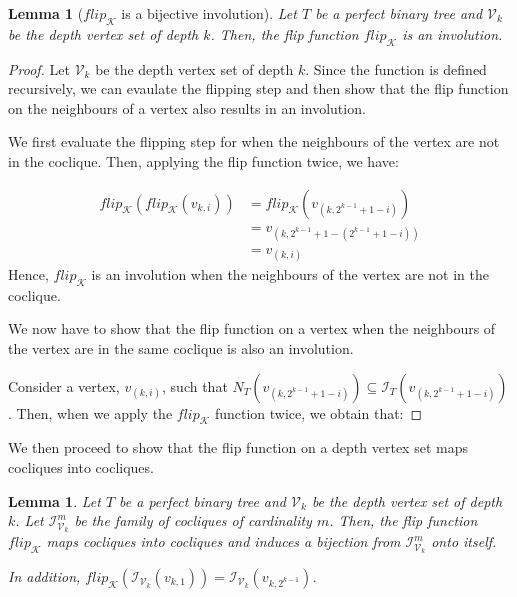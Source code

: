 \documentclass[11pt,a4paper]{article}
\newtheorem{lemma}[theorem]{Lemma}
\theoremstyle{definition}
\begin{document}
\begin{lemma}[$flip_\mathcal{K}$ is a bijective involution]\label{lemma_flip_bijective_involution}
	Let $T$ be a perfect binary tree and $\mathcal{V}_k$ be the depth vertex set of depth $k$. Then, the flip function $flip_\mathcal{K}$ is an involution.
\end{lemma}
\begin{proof}
	Let $\mathcal{V}_k$ be the depth vertex set of depth $k$. Since the function is defined recursively, we can evaulate the flipping step and then show that the flip function on the neighbours of a vertex also results in an involution.

	We first evaluate the flipping step for when the neighbours of the vertex are not in the coclique. Then, applying the flip function twice, we have:

	\begin{align*}
		flip_\mathcal{K}(flip_\mathcal{K}(v_{k, i})) & = flip_\mathcal{K}(v_{(k, 2^{k-1} + 1 - i)}) \\
		                                             & = v_{(k, 2^{k-1} + 1 - (2^{k-1} + 1 - i))}   \\
		                                             & = v_{(k, i)}
	\end{align*}
	Hence, $flip_\mathcal{K}$ is an involution when the neighbours of the vertex are not in the coclique.

	We now have to show that the flip function on a vertex when the neighbours of the vertex are in the same coclique is also an involution.

	Consider a vertex, $v_{(k, i)}$, such that $N_T(v_{(k, 2^{k-1} + 1 - i)}) \subseteq \mathcal{I}_T(v_{(k, 2^{k-1} + 1 - i)})$. Then, when we apply the $flip_\mathcal{K}$ function twice, we obtain that:

\end{proof}

We then proceed to show that the flip function on a depth vertex set maps cocliques into cocliques.

\begin{lemma}\label{lemma_flip_independent_sets}
	Let $T$ be a perfect binary tree and $\mathcal{V}_k$ be the depth vertex set of depth $k$. Let $\mathcal{I}^m_{\mathcal{V}_k}$ be the family of cocliques of cardinality $m$. Then, the flip function $flip_\mathcal{K}$ maps cocliques into cocliques and induces a bijection from $\mathcal{I}^m_{\mathcal{V}_k}$ onto itself.

	In addition, $flip_\mathcal{K}(\mathcal{I}_{\mathcal{V}_k}(v_{k, 1})) = \mathcal{I}_{\mathcal{V}_k}(v_{k, 2^{k-1}})$.
\end{lemma}
\end{document}
